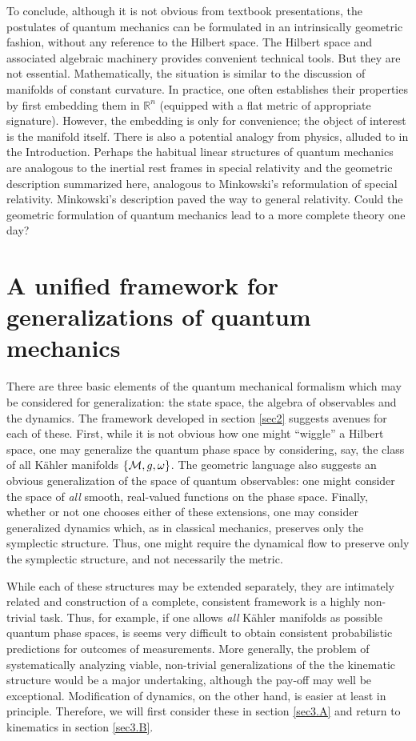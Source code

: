 \documentclass[12pt,aps,eqsecnum,tighten]{revtex4-2}
\def\M{{\cal M}}
\def\w{\omega}
\def\R{\mathbb R}
\begin{document}
To conclude, although it is not obvious from textbook presentations,
the postulates of quantum mechanics can be formulated in an
intrinsically geometric fashion, without any reference to the Hilbert
space. The Hilbert space and associated algebraic machinery provides
convenient technical tools. But they are not
essential. Mathematically, the situation is similar to the discussion
of manifolds of constant curvature.  In practice, one often
establishes their properties by first embedding them in $\R^n$
(equipped with a flat metric of appropriate signature). However, the
embedding is only for convenience; the object of interest is the
manifold itself. There is also a potential analogy from physics,
alluded to in the Introduction.  Perhaps the habitual linear
structures of quantum mechanics are analogous to the inertial rest
frames in special relativity and the geometric description summarized
here, analogous to Minkowski's reformulation of special relativity.
Minkowski's description paved the way to general relativity.  Could
the geometric formulation of quantum mechanics lead to a more complete
theory one day?


\section{A unified framework for generalizations of quantum 
mechanics} \label{sec3}

There are three basic elements of the quantum mechanical formalism
which may be considered for generalization: the state space, the
algebra of observables and the dynamics.  The framework developed in
section \ref{sec2} suggests avenues for each of these.  First, while
it is not obvious how one might ``wiggle'' a Hilbert space, one may
generalize the quantum phase space by considering, say, the class of
all K\"ahler manifolds $\{ \M, g, \w \}$.  The geometric language also
suggests an obvious generalization of the space of quantum
observables: one might consider the space of {\em all} smooth,
real-valued functions on the phase space.  Finally, whether or not one
chooses either of these extensions, one may consider generalized
dynamics which, as in classical mechanics, preserves only the
symplectic structure. Thus, one might require the dynamical flow to
preserve only the symplectic structure, and not necessarily the
metric.

While each of these structures may be extended separately, they are
intimately related and construction of a complete, consistent
framework is a highly non-trivial task. Thus, for example, if one
allows {\it all} K\"ahler manifolds as possible quantum phase spaces,
is seems very difficult to obtain consistent probabilistic predictions
for outcomes of measurements. More generally, the problem of
systematically analyzing viable, non-trivial generalizations of the
the kinematic structure would be a major undertaking, although the
pay-off may well be exceptional. Modification of dynamics, on the
other hand, is easier at least in principle. Therefore, we will first
consider these in section \ref{sec3.A} and return to kinematics in
section \ref{sec3.B}.
\end{document}
